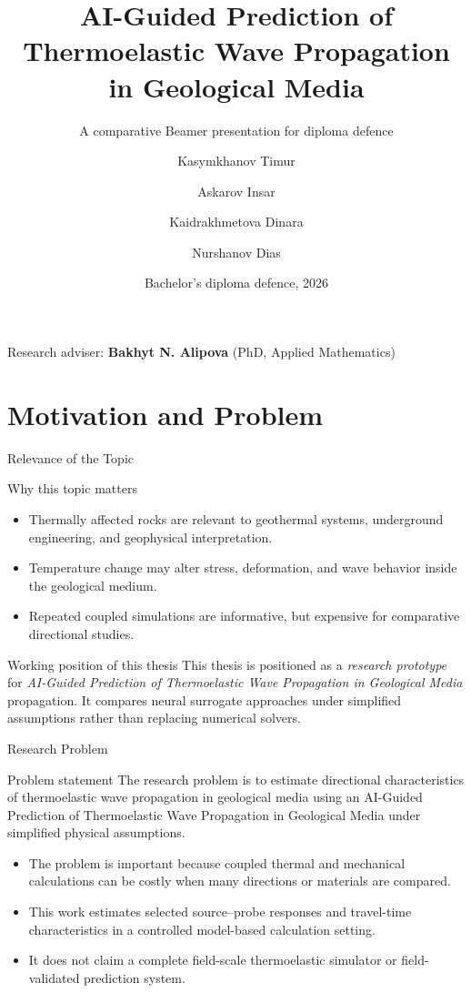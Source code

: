 \documentclass[aspectratio=169,10pt]{beamer}
\title[AI-Guided Thermoelastic Prediction]{%
  AI-Guided Prediction of Thermoelastic Wave Propagation%
  \texorpdfstring{\\}{ }%
  in Geological Media%
}
\subtitle{A comparative Beamer presentation for diploma defence}
\author[Group of 4]{%
  Kasymkhanov Timur \and Askarov Insar \and Kaidrakhmetova Dinara \and Nurshanov Dias%
}
\institute{International Information Technology University}
\date{Bachelor's diploma defence, 2026}
\begin{document}
\begin{frame}[plain]
  \titlepage
  \vfill
  \begin{center}\footnotesize
    Research adviser: \textbf{Bakhyt N. Alipova} (PhD, Applied Mathematics)
  \end{center}
\end{frame}

\section{Motivation and Problem}

\begin{frame}{Relevance of the Topic}
  \begin{block}{Why this topic matters}
    \begin{itemize}
      \item Thermally affected rocks are relevant to geothermal systems,
            underground engineering, and geophysical interpretation.
      \item Temperature change may alter stress, deformation, and wave behavior
            inside the geological medium.
      \item Repeated coupled simulations are informative, but expensive for
            comparative directional studies.
    \end{itemize}
  \end{block}
  \vskip 6pt
  \begin{exampleblock}{Working position of this thesis}
    This thesis is positioned as a \emph{research prototype} for
    \emph{AI-Guided Prediction of Thermoelastic Wave Propagation in Geological Media}
    propagation. It compares neural surrogate approaches under simplified
    assumptions rather than replacing numerical solvers.
  \end{exampleblock}
\end{frame}

\begin{frame}{Research Problem}
  \begin{exampleblock}{Problem statement}
    The research problem is to estimate directional characteristics of
    thermoelastic wave propagation in geological media using an
    AI-Guided Prediction of Thermoelastic Wave Propagation in Geological Media
    under simplified physical assumptions.
  \end{exampleblock}
  \vskip 6pt
  \begin{itemize}
    \item The problem is important because coupled thermal and mechanical
          calculations can be costly when many directions or materials are compared.
    \item This work estimates selected source--probe responses and travel-time
          characteristics in a controlled model-based calculation setting.
    \item It does not claim a complete field-scale thermoelastic simulator or
          field-validated prediction system.
  \end{itemize}
\end{frame}
\end{document}
